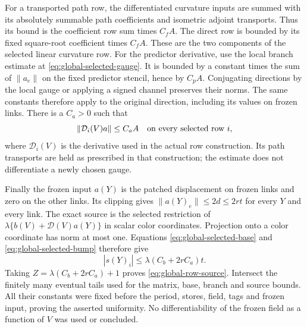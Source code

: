 For a transported path row, the differentiated curvature inputs are
summed with its absolutely summable path coefficients and isometric
adjoint transports. Thus its bound is the coefficient row sum times
$C_f A$. The direct row is bounded by its fixed square-root coefficient
times $C_f A$. These are the two components of the selected linear
curvature row. For the predictor derivative, use the local branch
estimate at \eqref{eq:global-selected-gauge}. It is bounded by a
constant times the sum of $\|a_e\|$ on the fixed predictor stencil,
hence by $C_p A$. Conjugating directions by the local gauge or applying
a signed channel preserves their norms. The same constants therefore
apply to the original direction, including its values on frozen links.
There is a $C_a>0$ such that
\begin{equation}\label{eq:global-selected-bump}
       \|\mathcal D_i(V)a\|\le C_a A
                         \quad\hbox{on every selected row }i,
\end{equation}
where $\mathcal D_i(V)$ is the derivative used in the actual row
construction. Its path transports are held as prescribed in that
construction; the estimate does not differentiate a newly chosen gauge.

Finally the frozen input $a(Y)$ is the patched displacement on frozen
links and zero on the other links. Its clipping gives
$\|a(Y)_e\|\le2d\le2rt$ for every $Y$ and every link.
The exact source is the selected restriction of
$\lambda\{b(V)+\mathcal D(V)a(Y)\}$ in scalar color coordinates.
Projection onto a color coordinate has norm at most one. Equations
\eqref{eq:global-selected-base} and \eqref{eq:global-selected-bump}
therefore give
\[
            |s(Y)_i|\le\lambda(C_b+2rC_a)t.
\]
Taking $Z=\lambda(C_b+2rC_a)+1$ proves
\eqref{eq:global-row-source}. Intersect the finitely many eventual
tails used for the matrix, base, branch and source bounds. All their
constants were fixed before the period, stores, field, tags and frozen
input, proving the asserted uniformity. No differentiability of the
frozen field as a function of $V$ was used or concluded.
